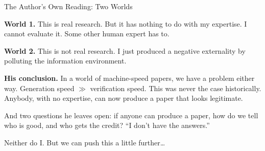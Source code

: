 \documentclass[svgnames,x11names,dvipsnames]{beamer}
\begin{document}
\begin{frame}{The Author's Own Reading: Two Worlds}

\textbf{World 1.} This is real research. But it has nothing to do with my expertise. I cannot evaluate it. Some other human expert has to.

\vspace{0.2cm}

\textbf{World 2.} This is not real research. I just produced a negative externality by polluting the information environment.

\vspace{0.4cm}

\textbf{His conclusion.} In a world of machine-speed papers, we have a problem either way.
\alert{Generation speed $\gg$ verification speed.} This was never the case historically.
Anybody, with no expertise, can now produce a paper that looks legitimate.

\vspace{0.3cm}

{\small And two questions he leaves open: if anyone can produce a paper, how do we tell who is good, and who gets the credit? ``I don't have the answers.''}

\vspace{0.3cm}

\centering Neither do I. But we can push this a little further\ldots

\end{frame}
\end{document}
